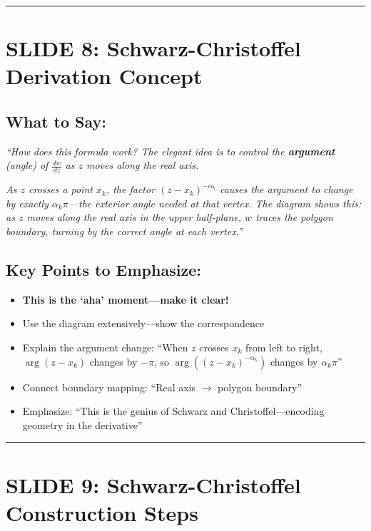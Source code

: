 \documentclass[12pt,a4paper]{article}
\begin{document}
\vspace{10pt}
\hrule
\vspace{10pt}

\section*{SLIDE 8: Schwarz-Christoffel Derivation Concept}

\subsection*{What to Say:}
\begin{quotebox}
\textit{``How does this formula work? The elegant idea is to control the \textbf{argument} (angle) of $\frac{dw}{dz}$ as $z$ moves along the real axis.}

\textit{As $z$ crosses a point $x_k$, the factor $(z - x_k)^{-\alpha_k}$ causes the argument to change by exactly $\alpha_k\pi$---the exterior angle needed at that vertex. The diagram shows this: as $z$ moves along the real axis in the upper half-plane, $w$ traces the polygon boundary, turning by the correct angle at each vertex.''}
\end{quotebox}

\subsection*{Key Points to Emphasize:}
\begin{itemize}[leftmargin=*]
    \item \textbf{This is the `aha' moment---make it clear!}
    \item Use the diagram extensively---show the correspondence
    \item Explain the argument change: ``When $z$ crosses $x_k$ from left to right, $\arg(z - x_k)$ changes by $-\pi$, so $\arg((z - x_k)^{-\alpha_k})$ changes by $\alpha_k\pi$''
    \item Connect boundary mapping: ``Real axis $\rightarrow$ polygon boundary''
    \item Emphasize: ``This is the genius of Schwarz and Christoffel---encoding geometry in the derivative''
\end{itemize}

\vspace{10pt}
\hrule
\vspace{10pt}

\section*{SLIDE 9: Schwarz-Christoffel Construction Steps}
\end{document}
